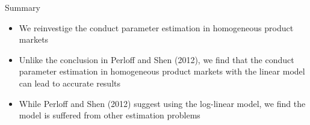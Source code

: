 \documentclass[aspectratio = 169]{beamer}
\theoremstyle{definition}
\begin{document}
\begin{frame}{Summary}
    \begin{itemize}
        \item We reinvestige the conduct parameter estimation in homogeneous product markets
        \item Unlike the conclusion in Perloff and Shen (2012), we find that the conduct parameter estimation in homogeneous product markets with the linear model can lead to accurate results
        \item While Perloff and Shen (2012) suggest using the log-linear model, we find the model is suffered from other estimation problems
    \end{itemize}
\end{frame}
\end{document}
